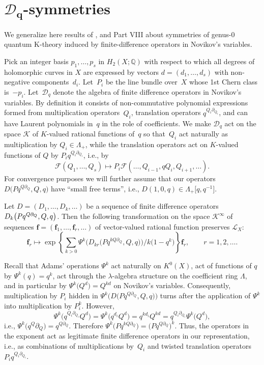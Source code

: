 \documentclass[pdftex]{sigma}
\def\D{\mathcal D}
\def\F{\mathcal F}
\def\K{\mathcal K}
\def\L{\mathcal L}
\def\QQ{\mathbb Q}
\def\p{\partial}
\def\f{{\mathbf f}}
\begin{document}
\section[$\D_q$-symmetries]{$\boldsymbol{\D_q}$-symmetries}\label{section3}

We generalize here results of \cite{GiE, GiTo}, and Part VIII about symmetries of genus-0 quantum K-theory induced by finite-difference operators in Novikov's variables.

Pick an integer basis $p_1,\dots, p_s$ in $H_2(X;\QQ)$ with respect to which all degrees of holomorphic curves in $X$ are expressed by vectors $d=(d_1,\dots,d_s)$ with non-negative components~$d_i$. Let~$P_i$ be the line bundle over~$X$ whose 1st Chern class is~$-p_i$. Let~$\D_q$ denote the algebra of finite difference operators in Novikov's variables. By definition it consists of non-commutative polynomial expressions formed from multiplication operators~$Q_i$, translation operators $q^{Q_i\p_{Q_i}}$, and can have Laurent polynomials in~$q$ in the role of coefficients. We make $\D_q$ act on the space $\K$ of $K$-valued rational functions of~$q$ so that~$Q_i$ act naturally as multiplication by $Q_i\in \Lambda_{+}$, while the translation operators act on
$K$-valued functions of $Q$ by $P_iq^{Q_i\p_{Q_i}}$, i.e., by
\[ \F (Q_1,\dots, Q_s) \mapsto P_i \F (\dots, Q_{i-1}, qQ_i, Q_{i+1},\dots
).\]
For convergence purposes we will further assume that our operators $D\big(Pq^{Q\p_Q},Q,q\big)$ have ``small free terms'', i.e., $D(1,0,q)\in \Lambda_{+}\big[q,q^{-1}\big]$.

\begin{theorem}\label{Theorem3} Let $D=(D_1,\dots,D_k,\dots)$ be a sequence of finite
 difference operators $D_k\big(Pq^{Q\p_Q},\linebreak Q, q\big)$. Then the following transformation
 on the space $\K^{\infty}$ of sequences $\f=(\f_1,\dots,\f_r,\dots)$ of vector-valued rational function preserves $\L_X$:
\[ \f_r \mapsto \exp\left\{ \sum_{k>0}
 \Psi^k \big(D_{kr}\big(Pq^{kQ\p_Q},Q,q\big)\big)/k\big(1-q^k\big)\right\} \f_r,\qquad r=1,2,\dots .\]
\end{theorem}

\begin{remark} Recall that Adams' operations $\Psi^k$ act naturally on
$K^0(X)$, act of functions of $q$ by $\Psi^k(q)=q^k$, act through the $\lambda$-algebra structure on the coefficient ring $\Lambda$, and in particular by $\Psi^k\big(Q^d\big)=Q^{kd}$ on Novikov's variables. Consequently, multiplication by $P_i$ hidden in $\Psi^k \big(D\big(Pq^{Q\p_Q},Q,q\big)\big)$ turns after the application of $\Psi^k$ into multiplication by $P_i^k$. However,
\[ \Psi^k \big(q^{Q_i\p_{Q_i}} Q^d\big) =\Psi^k\big(q^{d_i} Q^d\big) = q^{kd_i} Q^{kd} = q^{Q_i\p_{Q_i}} \Psi^k\big(Q^d\big),\]
i.e., $\Psi^k \big(q^Q\p_Q\big) =q^{Q\p_Q}$. Therefore $\Psi^k\big(Pq^{kQ\p_Q}\big)=\big(Pq^{Q\p_Q}\big)^k$. Thus, the operators in the exponent act as legitimate finite difference operators in our representation, i.e., as combinations of
multiplications by~$Q_i$ and twisted translation operators $P_iq^{Q_i\p_{Q_i}}$.
\end{remark}
\end{document}

